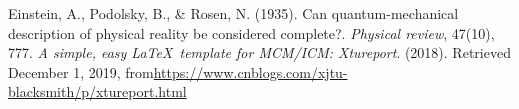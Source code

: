 \documentclass[12pt]{article}  %
\begin{document}
\begin{thebibliography}{99}
 Einstein, A., Podolsky, B., \& Rosen, N. (1935). Can quantum-mechanical description of physical reality be considered complete?. \emph{Physical review}, 47(10), 777.
 \emph{A simple, easy \LaTeX\ template for MCM/ICM: Xtureport}. (2018). Retrieved December 1, 2019, from\url{https://www.cnblogs.com/xjtu-blacksmith/p/xtureport.html}
\end{thebibliography}


\end{document}
